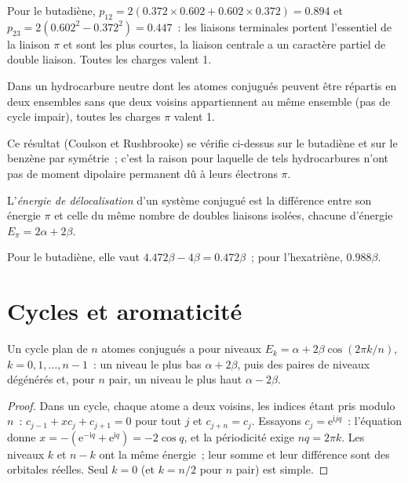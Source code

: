 Pour le butadiène, $p_{12} = 2(0.372 \times 0.602 + 0.602 \times 0.372) = 0.894$ et $p_{23} =
2(0.602^2 - 0.372^2) = 0.447$~: les liaisons terminales portent l'essentiel de la liaison $\pi$ et sont
les plus courtes, la liaison centrale a un caractère partiel de double liaison. Toutes les charges valent
1.

\begin{proposition}\label{prop:b2:huckel:alternant}
Dans un hydrocarbure neutre dont les atomes conjugués peuvent être répartis en deux ensembles sans
que deux voisins appartiennent au même ensemble (pas de cycle impair), toutes les charges $\pi$ valent 1.
\end{proposition}

\admitted

Ce résultat (Coulson et Rushbrooke) se vérifie ci-dessus sur le butadiène et sur le benzène par
symétrie~; c'est la raison pour laquelle de tels hydrocarbures n'ont pas de moment dipolaire permanent dû à leurs
électrons $\pi$.

\begin{definition}\label{def:b2:huckel:delocalisation}
L'\emph{énergie de délocalisation} d'un système
conjugué est la différence entre son énergie $\pi$ et celle du même nombre de
doubles liaisons isolées, chacune d'énergie $E_\pi = 2\alpha + 2\beta$.
\end{definition}

Pour le butadiène, elle vaut $4.472\beta - 4\beta = 0.472\beta$~; pour l'hexatriène, $0.988\beta$.

\section{Cycles et aromaticité}

\begin{theorem}\label{thm:b2:huckel:ring}
Un cycle plan de $n$ atomes conjugués a pour niveaux $E_k = \alpha + 2\beta\cos(2\pi k/n)$,
$k = 0, 1, \dots, n - 1$~: un niveau le plus bas $\alpha + 2\beta$, puis des paires de niveaux
dégénérés et, pour $n$ pair, un niveau le plus haut $\alpha - 2\beta$.
\end{theorem}

\begin{proof}
Dans un cycle, chaque atome a deux voisins, les indices étant pris modulo $n$~:
$c_{j-1} + xc_j + c_{j+1} = 0$ pour tout $j$ et $c_{j+n} = c_j$. Essayons $c_j = \mathrm e^{\mathrm
i jq}$~: l'équation donne $x = -(\mathrm e^{-\mathrm iq} + \mathrm e^{\mathrm iq}) = -2\cos q$,
et la périodicité exige $nq = 2\pi k$. Les niveaux $k$ et $n - k$ ont la même
énergie~; leur somme et leur différence sont des orbitales réelles. Seul $k = 0$ (et $k = n/2$ pour
$n$ pair) est simple.
\end{proof}

